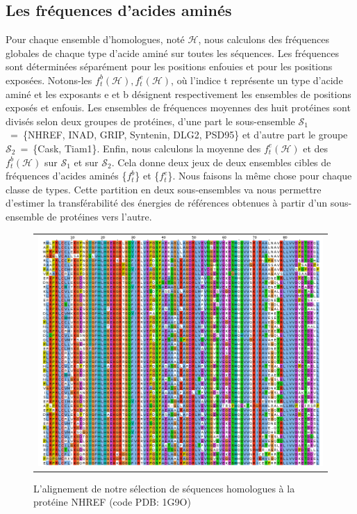 \subsection{Les fréquences d'acides aminés}

Pour chaque ensemble d'homologues, noté $\mathcal{H}$, nous calculons des fréquences globales de chaque type d'acide aminé sur toutes les séquences. Les fréquences sont déterminées séparément pour les positions enfouies et pour les positions exposées. Notons-les ${f^b_t(\mathcal{H}), f^e_t(\mathcal{H})}$, où l'indice t représente un type d'acide aminé et les exposants e et b désignent respectivement les ensembles de positions exposés et enfouis. Les ensembles de fréquences moyennes des huit protéines sont divisés selon deux groupes de protéines, d'une part le sous-ensemble $\mathcal{S}_1$~=~\{NHREF, INAD, GRIP, Syntenin, DLG2, PSD95\} et d'autre part le groupe $\mathcal{S}_2$~=~\{Cask, Tiam1\}. Enfin, nous calculons la moyenne des $f^e_t(\mathcal{H})$ et des $f^b_t(\mathcal{H})$ sur $\mathcal{S}_1$ et sur $\mathcal{S}_2$. Cela donne deux jeux de deux ensembles cibles de fréquences d'acides aminés \{$f^b_t$\} et \{$f^e_t$\}. Nous faisons la même chose pour chaque classe de types. Cette partition en deux sous-ensembles va nous permettre d'estimer la transférabilité des énergies de références obtenues à partir d'un sous-ensemble de protéines vers l'autre.
\label{subsection:freqaa}
        

   \begin{figure}[t]
     \centering
     \begin{tabular}{c}
       \includegraphics[width=17cm]{homologues/1G9O.png} \\
     \end{tabular}
     \caption{L'alignement de notre sélection de séquences homologues à la protéine NHREF (code PDB: 1G9O)}
\label{align_homo:NHREF}
   \end{figure}

